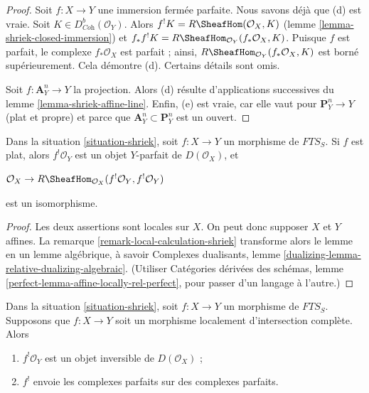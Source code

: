 \begin{proof}
\medskip\noindent
Soit $f : X \to Y$ une immersion fermée parfaite. Nous savons déjà que (d) est vraie. Soit $K \in D^b_{\textit{Coh}}(\mathcal{O}_Y)$. Alors $f^!K = R\SheafHom(\mathcal{O}_X, K)$ (lemme \ref{lemma-shriek-closed-immersion}) et $f_*f^!K = R\SheafHom_{\mathcal{O}_Y}(f_*\mathcal{O}_X, K)$. Puisque $f$ est parfait, le complexe $f_*\mathcal{O}_X$ est parfait ; ainsi, $R\SheafHom_{\mathcal{O}_Y}(f_*\mathcal{O}_X, K)$ est borné supérieurement. Cela démontre (d). Certains détails sont omis.

\medskip\noindent
Soit $f : \mathbf{A}^n_Y \to Y$ la projection. Alors (d) résulte d'applications successives du lemme \ref{lemma-shriek-affine-line}. Enfin, (e) est vraie, car elle vaut pour $\mathbf{P}^n_Y \to Y$ (plat et propre) et parce que $\mathbf{A}^n_Y \subset \mathbf{P}^n_Y$ est un ouvert.
\end{proof}

\begin{lemma}
\label{lemma-flat-shriek-relatively-perfect}
Dans la situation \ref{situation-shriek}, soit $f : X \to Y$ un morphisme de $\textit{FTS}_S$. Si $f$ est plat, alors $f^!\mathcal{O}_Y$ est un objet $Y$-parfait de $D(\mathcal{O}_X)$, et
\par\noindent\hfil
$\mathcal{O}_X \to
R\SheafHom_{\mathcal{O}_X}(f^!\mathcal{O}_Y, f^!\mathcal{O}_Y)$
\hfil\par\noindent
est un isomorphisme.
\end{lemma}

\begin{proof}
Les deux assertions sont locales sur $X$. On peut donc supposer $X$ et $Y$ affines. La remarque \ref{remark-local-calculation-shriek} transforme alors le lemme en un lemme algébrique, à savoir Complexes dualisants, lemme \ref{dualizing-lemma-relative-dualizing-algebraic}. (Utiliser Catégories dérivées des schémas, lemme \ref{perfect-lemma-affine-locally-rel-perfect}, pour passer d'un langage à l'autre.)
\end{proof}

\begin{lemma}
\label{lemma-lci-shriek}
Dans la situation \ref{situation-shriek}, soit $f : X \to Y$ un morphisme de $\textit{FTS}_S$. Supposons que $f : X \to Y$ soit un morphisme localement d'intersection complète. Alors
\begin{enumerate}
\item $f^!\mathcal{O}_Y$ est un objet inversible de $D(\mathcal{O}_X)$ ;
\item $f^!$ envoie les complexes parfaits sur des complexes parfaits.
\end{enumerate}
\end{lemma}

